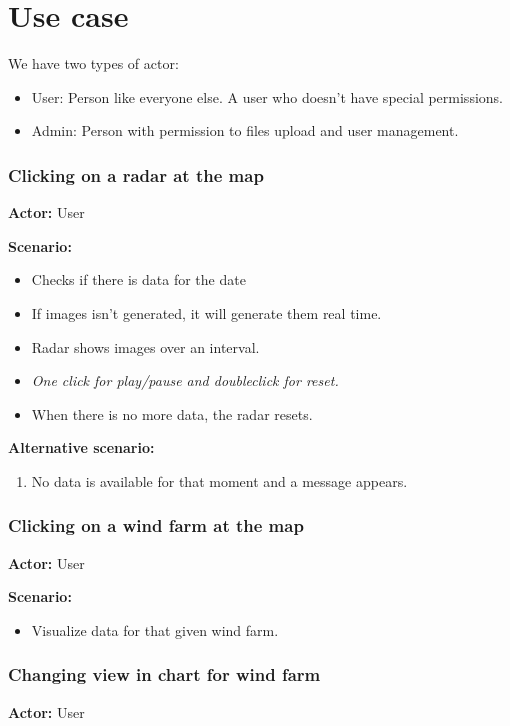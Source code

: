 \chapter{Use case}
We have two types of actor:
\begin{itemize}
\item User: Person like everyone else. A user who doesn't have special permissions.
\item Admin: Person with permission to files upload and user management.
\end{itemize}

\subsection{Clicking on a radar at the map}
\textbf{Actor:} User

\textbf{Scenario:}
\begin{itemize}
\item Checks if there is data for the date
\item If images isn't generated, it will generate them real time.
\item Radar shows images over an interval.
\item \emph{One click for play/pause and doubleclick for reset.}
\item When there is no more data, the radar resets.
\end{itemize}
\textbf{Alternative scenario:} 
\begin{enumerate}
\item No data is available for that moment and a message appears.
\end{enumerate}

\subsection{Clicking on a wind farm at the map}
\textbf{Actor:} User

\textbf{Scenario:}
\begin{itemize}
\item Visualize data for that given wind farm.
\end{itemize}

\subsection{Changing view in chart for wind farm}
\textbf{Actor:} User

